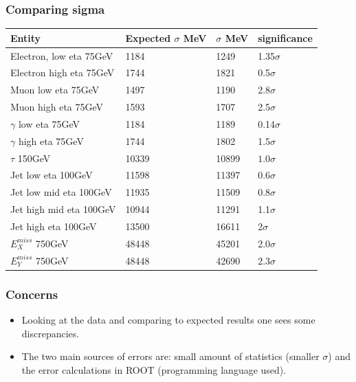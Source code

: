 \documentclass[•]{beamer}
\theoremstyle{remark}
\begin{document}
\begin{frame}[shrink=20]\frametitle{Comparing sigma}
\begin{center}
    \begin{tabular}{ | l | l | l | l |}
    \hline
    Entity & Expected $\sigma$ MeV & $\sigma$ MeV & significance \\ \hline
    Electron, low eta 75GeV & 1184 & 1249 & 1.35$\sigma$ \\ \hline
    Electron high eta 75GeV & 1744 & 1821 & 0.5$\sigma$ \\ \hline
    Muon low eta 75GeV & 1497 & 1190 & 2.8$\sigma$ \\ \hline
    Muon high eta 75GeV & 1593 & 1707 & 2.5$\sigma$ \\ \hline
   	$\gamma$ low eta 75GeV & 1184 & 1189 & 0.14$\sigma$ \\ \hline
    $\gamma$ high eta 75GeV & 1744 & 1802 & 1.5$\sigma$ \\ \hline
    $\tau$ 150GeV & 10339 & 10899 & $1.0\sigma$ \\ \hline
    	Jet low eta 100GeV & 11598 & 11397 & 0.6$\sigma$ \\ \hline
    Jet low mid eta 100GeV & 11935 & 11509 & 0.8$\sigma$ \\ \hline
    Jet high mid eta 100GeV & 10944 & 11291 & 1.1$\sigma$ \\ \hline
    Jet high eta 100GeV& 13500 & 16611 & 2$\sigma$ \\ \hline
      $E^{miss}_X$ 750GeV & 48448 & 45201 & 2.0$\sigma$ \\ \hline
       $E^{miss}_Y$ 750GeV & 48448 & 42690 & 2.3$\sigma$ \\ \hline
    \end{tabular}
\end{center}
\end{frame}
\begin{frame}\frametitle{Concerns}
\begin{block}

\begin{itemize}

\item Looking at the data and comparing to expected results one sees some discrepancies. 
\item The two main sources of errors are: small amount of statistics (smaller $\sigma$) and the error calculations in ROOT (programming language used).
\end{itemize}
\end{block}
\end{frame}
\end{document}
